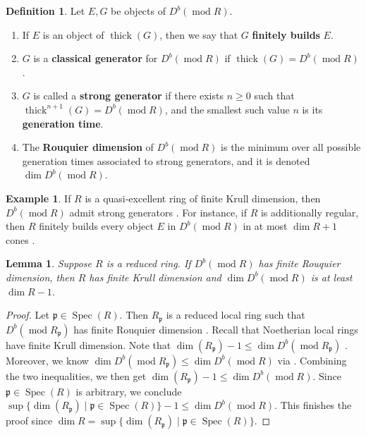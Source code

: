 \documentclass[11pt]{amsart}
\theoremstyle{plain}
\newtheorem{lemma}[theorem]{Lemma}
\theoremstyle{definition}
\newtheorem{definition}[theorem]{Definition}
\newtheorem{example}[theorem]{Example}
\numberwithin{equation}{section}
\numberwithin{theorem}{section}
\begin{document}
\begin{definition}
    Let $E,G$ be objects of $D^b (\operatorname{mod}R)$.
    \begin{enumerate}
        \item If $E$ is an object of $\operatorname{thick} (G)$, then we say that $G$ \textbf{finitely builds} $E$.
        \item $G$ is a \textbf{classical generator} for $D^b (\operatorname{mod}R)$ if $\operatorname{thick} (G) = D^b (\operatorname{mod}R)$. 
        \item $G$ is called a \textbf{strong generator} if there exists $n\geq 0$ such that $\operatorname{thick}^{n+1} (G) = D^b (\operatorname{mod}R)$, and the smallest such value $n$ is its \textbf{generation time}. 
        \item The \textbf{Rouquier dimension} of $D^b (\operatorname{mod}R)$ is the minimum over all possible generation times associated to strong generators, and it is denoted $\dim D^b(\operatorname{mod}R)$.
    \end{enumerate}
\end{definition}

\begin{example}
    If $R$ is a quasi-excellent ring of finite Krull dimension, then $D^b (\operatorname{mod}R)$ admit strong generators \cite[Main Theorem]{Aoki:2021}. For instance, if $R$ is additionally regular, then $R$ finitely builds every object $E$ in $D^b (\operatorname{mod}R)$ in at most $\dim R + 1$ cones \cite{Christensen:1998}.
\end{example}

\begin{lemma}\label{lem:reduced_Rouquier_bound}
    Suppose $R$ is a reduced ring. If $D^b(\operatorname{mod}R)$ has finite Rouquier dimension, then $R$ has finite Krull dimension and $\dim D^b(\operatorname{mod}R)$ is at least $\dim R -1$. 
\end{lemma}

\begin{proof} 
    Let $\mathfrak p  \in \operatorname{Spec}(R)$. Then $R_{\mathfrak p}$ is a reduced local ring such that $D^b(\operatorname{mod}R_{\mathfrak p})$ has finite Rouquier dimension \cite[Lemma 4.2(3)]{Aihara/Takahashi:2015}. Recall that Noetherian local rings have finite Krull dimension. Note that $\dim(R_{\mathfrak p})-1\le \dim D^b(\operatorname{mod}R_{\mathfrak p})$ \cite[Corollary 6.6]{Aihara/Takahashi:2015}. Moreover, we know $\dim D^b(\operatorname{mod}R_{\mathfrak p})\le \dim D^b(\operatorname{mod}R)$ via \cite[Lemma 4.2(3)]{Aihara/Takahashi:2015}. Combining the two inequalities, we then get $\dim(R_{\mathfrak p})-1\le \dim D^b(\operatorname{mod}R)$. Since $\mathfrak p \in \operatorname{Spec}(R)$ is arbitrary, we conclude $\sup\{\dim(R_{\mathfrak p})\mid \mathfrak p\in \operatorname{Spec}(R)\}-1\le \dim D^b(\operatorname{mod}R)$. This finishes the proof since $\dim R=\sup\{\dim(R_{\mathfrak p})\mid \mathfrak p\in \operatorname{Spec}(R)\}$. 
\end{proof}  
\end{document}
